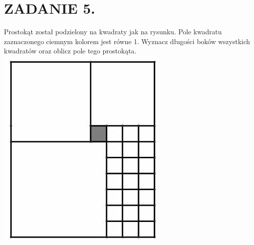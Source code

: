 \documentclass[10pt]{article}
\begin{document}
\section*{ZADANIE 5.}
Prostokąt został podzielony na kwadraty jak na rysunku. Pole kwadratu zaznaczonego ciemnym kolorem jest równe 1. Wyznacz długości boków wszystkich kwadratów oraz oblicz pole tego prostokąta.\\
\includegraphics[max width=\textwidth, center]{2024_11_21_999f692427d726960eb3g-1}
\end{document}
